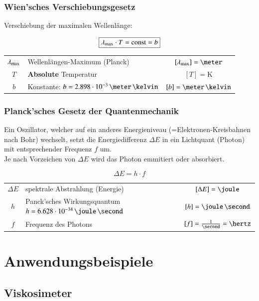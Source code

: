 \subsubsection{Wien'sches Verschiebungsgesetz}

Verschiebung der maximalen Wellenlänge:

$$ \boxed{ \lambda_{\rm max} \cdot T = \mathop{} \! \mathrm{const} = b } $$

\begin{tabular}{c l c}
	$\lambda_{\rm max}$	& Wellenlängen-Maximum (Planck) 							& $[\lambda_{\rm max}] = \meter$	\\
	$T$ 				& \textbf{Absolute} Temperatur 								& $[T] = \mathrm{K}$				\\
	$b$					& Konstante: $b = 2.898 \cdot 10^{-3} \, \meter \, \kelvin$	& $ [b] = \meter \, \kelvin$
\end{tabular}

\subsubsection{Planck'sches Gesetz der Quantenmechanik}

Ein Oszillator, welcher auf ein anderes Energieniveau (=Elektronen-Kreisbahnen nach Bohr) wechselt, setzt die Energiedifferenz 
$\Delta E$ in ein Lichtquant (Photon) mit entsprechender Frequenz $f$ um. \\
Je nach Vorzeichen von $\Delta E$ wird das Photon emmitiert oder absorbiert.

$$ \boxed { \Delta E = h \cdot f }  $$

\begin{tabular}{c l c}
	$\Delta E$ 	& spektrale Abstrahlung (Energie) 												& $[\Delta E] = \joule$ 				\\
	$h$ 		& Panck'sches Wirkungsquantum $h = 6.628 \cdot 10^{-34} \, \joule \, \second$	& $[h] =  \joule \, \second$			\\
	$f$ 		& Frequenz des Photons 															& $ [f] = \frac{1}{\second} = \hertz$
\end{tabular}


\pagebreak


\section{Anwendungsbeispiele}

\subsection{Viskosimeter}

